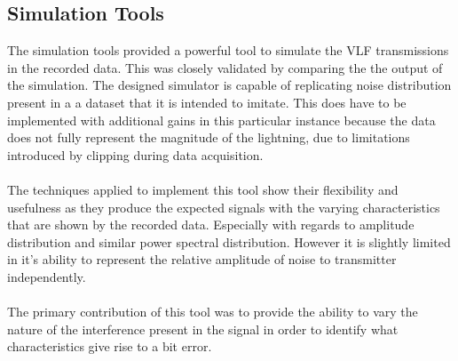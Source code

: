 \subsection{Simulation Tools}
The simulation tools provided a powerful tool to simulate the VLF transmissions in the recorded data. This was closely validated by comparing the the output of the simulation. The designed simulator is capable of replicating noise distribution present in a a dataset that it is intended to imitate. This does have to be implemented with additional gains in this particular instance because the data does not fully represent the magnitude of the lightning, due to limitations introduced by clipping during data acquisition. 
\\\\
The techniques applied to implement this tool show their flexibility and usefulness as they produce the expected signals with the varying characteristics that are shown by the recorded data. Especially with regards to amplitude distribution and similar power spectral distribution. However it is slightly limited in it's ability to represent the relative amplitude of noise to transmitter independently.
\\\\
The primary contribution of this tool was to provide the ability to vary the nature of the interference present in the signal in order to identify what characteristics give rise to a bit error.

